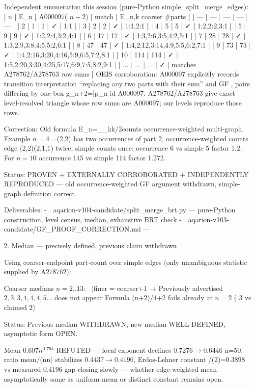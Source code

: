 Independent enumeration this session (pure-Python simple_split_merge_edges):
| $n$ | E_n | A000097( $n-2$) | match | E_{n,k} coarser #parts |
| --- | --- | --- | --- | --- |
| 2 | 1 | 1 | ✓ | {1:1} |
| 3 | 2 | 2 | ✓ | {1:1,2:1} |
| 4 | 5 | 5 | ✓ | {1:2,2:2,3:1} |
| 5 | 9 | 9 | ✓ | {1:2,2:4,3:2,4:1} |
| 6 | 17 | 17 | ✓ | {1:3,2:6,3:5,4:2,5:1} |
| 7 | 28 | 28 | ✓ | {1:3,2:9,3:8,4:5,5:2,6:1} |
| 8 | 47 | 47 | ✓ | {1:4,2:12,3:14,4:9,5:5,6:2,7:1} |
| 9 | 73 | 73 | ✓ | {1:4,2:16,3:20,4:16,5:9,6:5,7:2,8:1} |
| 10 | 114 | 114 | ✓ | {1:5,2:20,3:30,4:25,5:17,6:9,7:5,8:2,9:1} |
| ... | ... | ... | ✓ | matches A278762/A278763 row sums |
OEIS corroboration: A000097 explicitly records transition interpretation “replacing any two parts with their sum” and GF , pairs differing by one box g_{n+2}=\bar p_n id A000097. A278762/A278763 give exact level-resolved triangle whose row sums are A000097; our levels reproduce those rows.

Correction: Old formula E_n=\sum_{\lambda}\sum_{k\in\lambda}\lfloor k/2\rfloor counts occurrence-weighted multi-graph. Example $n=4$ \lambda=(2,2) has two occurrences of part 2, occurrence-weighted counts edge (2,2)\leftrightarrow(2,1,1) twice, simple counts once: occurrence 6 vs simple 5 factor 1.2. For $n=10$ occurrence 145 vs simple 114 factor 1.272.

Status:  PROVEN + EXTERNALLY CORROBORATED + INDEPENDENTLY REPRODUCED — old occurrence-weighted GF argument withdrawn, simple-graph definition correct.

Deliverables:
-
📎 aqarion-v104-candidate/split_merge_brt.py
— pure-Python construction, level census, median, exhaustive BRT check
-
📎 aqarion-v103-candidate/GF_PROOF_CORRECTION.md
---

2. Median — precisely defined, previous claim withdrawn

Using coarser-endpoint part-count over simple edges (only unambiguous statistic supplied by A278762):

Coarser medians $n=2..13$: \ (finer = coarser+1 → \)[1][2][3][4][5]
Previously advertised $2,3,3,4,4,4,5...$ does not appear
Formula \lfloor(n+2)/4\rfloor+2 fails already at $n=2$ ( $3$ vs claimed $2$)

Status: Previous median WITHDRAWN, new median WELL-DEFINED, asymptotic form OPEN.

Mean $0.607n^{0.794}$ REFUTED — local exponent declines $0.7276\to0.6446$ n=50, ratio mean/(\sqrt n\log n) stabilizes $0.4437\to0.4196$, Erdos-Lehner constant /(2\pi)=0.3898 vs measured $0.4196$ gap closing slowly — whether edge-weighted mean asymptotically same as uniform mean or distinct constant remains open.

